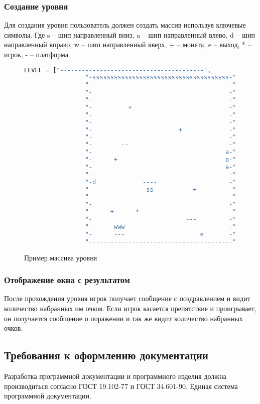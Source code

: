 \subsubsection{Создание уровня}

Для создания уровня пользователь должен создать массив используя ключевые символы. Где s -- шип направленный вниз, a -- шип направленный влево, d -- шип направленный вправо, w -- шип направленный вверх, + -- монета, e -- выход, * -- игрок, - -- платформа.
\begin{figure}[H]
	\begin{lstlisting}[language=Python]
		LEVEL = ["----------------------------------------",
				 "-ssssssssssssssssssssssssssssssssssssss-",
				 "-                                      -",
				 "-                                      -",
				 "-                                      -",
			 	 "-          +                           -",
			     "-                                      -",
				 "-                                      -",
				 "-                        +             -",
				 "-                                      -",
				 "-        --                            -",
				 "-                                     a-",
				 "-      +                              a-",
				 "-                                     a-",
				 "-                                      -",
				 "-d             ----                    -",
				 "-               ss           +         -",
				 "-                                      -",
				 "-                                      -",
				 "-     +      *                         -",
				 "-                          ---         -",
				 "-      www                             -",
				 "-      ---                     e       -",
				 "----------------------------------------"]
	\end{lstlisting}  
	\caption{Пример массива уровня}
	\label{unitUser:image}
\end{figure}

\subsubsection{Отображение окна с результатом}

После прохождения уровня игрок получает сообщение с поздравлением и видит количество набранных им очков. Если игрок касается препятствие и проигрывает, он получается сообщение о поражении и так же видит количество набранных очков.

\subsection{Требования к оформлению документации}

Разработка программной документации и программного изделия должна производиться согласно ГОСТ 19.102-77 и ГОСТ 34.601-90. Единая система программной документации.
